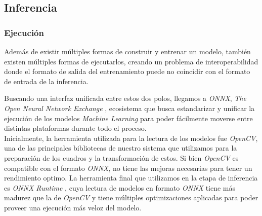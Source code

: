 \documentclass[a4paper]{article}
\begin{document}
\subsection{Inferencia}

\subsubsection{Ejecución}

Además de existir múltiples formas de construir y entrenar un modelo, también existen múltiples formas de ejecutarlos, creando un problema de interoperabilidad donde el formato de salida del entrenamiento puede no coincidir con el formato de entrada de la inferencia.

Buscando una interfaz unificada entre estos dos polos, llegamos a \textit{ONNX}, \textit{The Open Neural Network Exchange} \cite{onnx}, ecosistema que busca estandarizar y unificar la ejecución de los modelos \textit{Machine Learning} para poder fácilmente moverse entre distintas plataformas durante todo el proceso. \\

Inicialmente, la herramienta utilizada para la lectura de los modelos fue \textit{OpenCV}, una de las principales bibliotecas de nuestro sistema que utilizamos para la preparación de los cuadros y la transformación de estos. Si bien \textit{OpenCV} es compatible con el formato \textit{ONNX}, no tiene las mejoras necesarias para tener un rendimiento optimo. La herramienta final que utilizamos en la etapa de inferencia es \textit{ONNX Runtime} \cite{ort}, cuya lectura de modelos en formato \textit{ONNX} tiene más madurez que la de \textit{OpenCV} y tiene múltiples optimizaciones aplicadas para poder proveer una ejecución más veloz del modelo.
\end{document}
